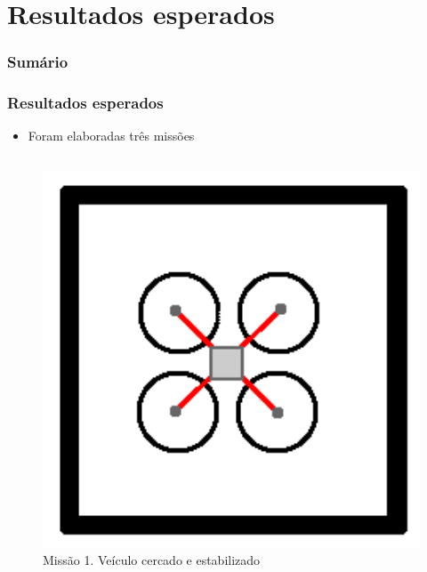 \documentclass{beamer}
\begin{document}
\section{Resultados esperados}

\begin{frame}
	\frametitle{Sumário}
	\tableofcontents[currentsection]
\end{frame}

\begin{frame}
	
	\frametitle{Resultados esperados}
	
	\begin{itemize}	
		
		\item  Foram elaboradas três missões
	\end{itemize}	
		\begin{columns}[T] %
			\begin{column}[T]{3cm} %
				\begin{figure}
					\centering
					\includegraphics[keepaspectratio = true,
					width=1.0\textwidth]{img/missao1.png}
					\caption{Missão 1. Veículo cercado e estabilizado}
					\label{fig:missao1}
				\end{figure}
			\end{column}

\end{columns}
\end{frame}
\end{document}
